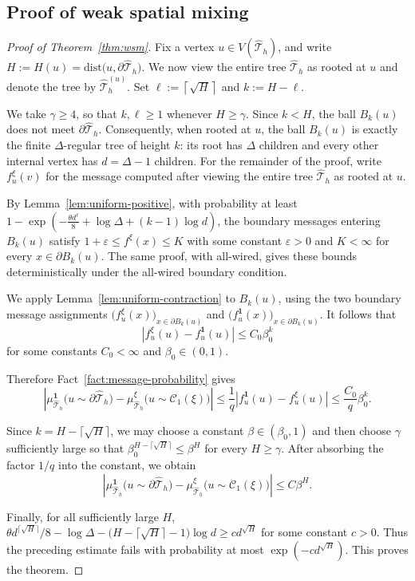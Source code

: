 \documentclass[11pt]{amsart}
\theoremstyle{plain}
\theoremstyle{definition}
\theoremstyle{remark}
\newcommand{\dreg}{\widehat {\mathcal T}_h}
\newcommand{\dist}{\mathrm{dist}}
\begin{document}
\subsection{Proof of weak spatial mixing}
\label{subsec:proof-wsm}

\begin{proof}[Proof of Theorem~\ref{thm:wsm}]
Fix a vertex $u\in V(\dreg)$, and write $H:=H(u)=\dist\bigl(u,\partial\dreg\bigr)$. We now view the entire tree $\dreg$ as rooted at $u$ and denote the tree by $\dreg^{(u)}$. Set $\ell:=\left\lceil\sqrt H\right\rceil$ and $k:=H-\ell$. 

We take $\gamma\ge4$, so that $k,\ell\ge1$ whenever $H\ge\gamma$. Since $k<H$, the ball $B_k(u)$ does not meet $\partial\dreg$. Consequently, when rooted at $u$, the ball $B_k(u)$ is exactly the finite $\Delta$-regular tree of height $k$: its root has $\Delta$ children and every other internal vertex has $d=\Delta-1$ children. For the remainder of the proof, write $f_u^\xi(v)$ for the message computed after viewing the entire tree $\dreg$ as rooted at $u$. 

By Lemma~\ref{lem:uniform-positive}, with probability at least $1-\exp\left(-\frac{\theta d^\ell}{8}+\log \Delta + (k-1)\log d\right)$, the boundary messages entering $B_k(u)$ satisfy $1+\varepsilon \le f^\xi(x) \le K$ with some constant $\varepsilon>0$ and $K<\infty$ for every $x\in\partial B_k(u)$. The same proof, with all-wired, gives these bounds deterministically under the all-wired boundary condition.

We apply Lemma~\ref{lem:uniform-contraction} to $B_k(u)$, using the two boundary message assignments $\bigl(f_u^\xi(x)\bigr)_{x\in\partial B_k(u)}$ and $\bigl(f_u^{\mathbf 1}(x)\bigr)_{x\in\partial B_k(u)}$. It follows that
\[
    \left|
        f_u^\xi(u)-f_u^{\mathbf 1}(u)
    \right|
    \le
    C_0\beta_0^k
\]
for some constants $C_0<\infty$ and $\beta_0\in(0,1)$.

Therefore Fact~\ref{fact:message-probability} gives
\[
\left|
    \mu_{\dreg}^{\mathbf 1}
    \bigl(u\sim\partial\dreg\bigr)
    -
    \mu_{\dreg}^{\xi}
    \bigl(u\sim\mathcal C_1(\xi)\bigr)
\right|
\le
\frac1q
\left|
    f_u^{\mathbf 1}(u)-f_u^\xi(u)
\right|
\le
\frac{C_0}{q}\beta_0^k.
\]

Since $k=H-\lceil\sqrt H\rceil$, we may choose a constant $\beta\in(\beta_0,1)$ and then choose $\gamma$ sufficiently large so that $\beta_0^{H-\lceil\sqrt H\rceil} \le\beta^H$ for every $H\ge\gamma$. After absorbing the factor $1/q$ into the
constant, we obtain
\[
\left|
    \mu_{\dreg}^{\mathbf 1}
    \bigl(u\sim\partial\dreg\bigr)
    -
    \mu_{\dreg}^{\xi}
    \bigl(u\sim\mathcal C_1(\xi)\bigr)
\right|
\le
C\beta^H.
\]

Finally, for all sufficiently large $H$, $\theta d^{\lceil\sqrt H\rceil}/8-\log\Delta-\bigl(H-\lceil\sqrt H\rceil-1\bigr)\log d\ge c d^{\sqrt H}$ for some constant $c>0$. Thus the preceding estimate fails with
probability at most $\exp\left(-c d^{\sqrt H}\right)$. This proves the theorem.
\end{proof}
\end{document}
